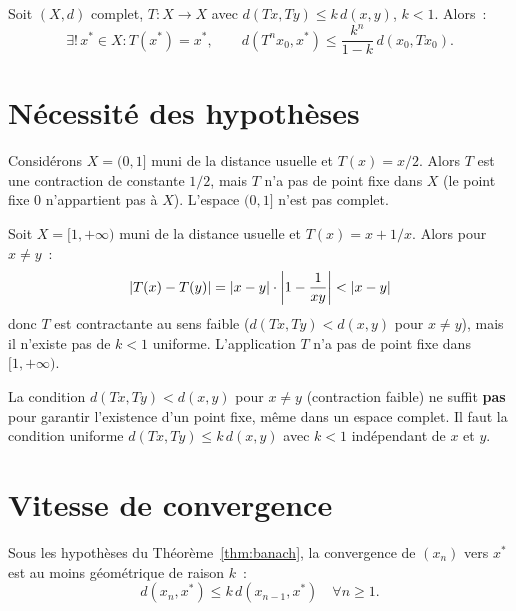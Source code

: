 \begin{formules}[title=\textbf{Principe de Contraction de Banach}]
Soit $(X, d)$ complet, $T : X \to X$ avec $d(Tx, Ty) \leq k \, d(x,y)$, $k < 1$. Alors~:
\[
    \exists!\, x^* \in X : T(x^*) = x^*, \qquad
    d(T^n x_0, x^*) \leq \frac{k^n}{1-k}\, d(x_0, Tx_0).
\]
\end{formules}

\section{N\'ecessit\'e des hypoth\`eses}

\begin{exemple}
Consid\'erons $X = (0, 1]$ muni de la distance usuelle et $T(x) = x/2$.
Alors $T$ est une contraction de constante $1/2$, mais $T$ n'a pas de point
fixe dans $X$ (le point fixe $0$ n'appartient pas \`a $X$). L'espace $(0,1]$
n'est pas complet.
\end{exemple}

\begin{exemple}[N\'ecessit\'e de $k < 1$]
Soit $X = [1, +\infty)$ muni de la distance usuelle et $T(x) = x + 1/x$.
Alors pour $x \neq y$~:
\[
    \left| T(x) - T(y) \right| = \left| x - y \right| \cdot \left| 1 - \frac{1}{xy} \right| < \left| x - y \right|
\]
donc $T$ est contractante au sens faible ($d(Tx, Ty) < d(x,y)$ pour $x \neq y$),
mais il n'existe pas de $k < 1$ uniforme. L'application $T$ n'a pas de point
fixe dans $[1, +\infty)$.
\end{exemple}

\begin{attention}[title=\textbf{Contraction stricte vs.\ contraction faible}]
La condition $d(Tx, Ty) < d(x,y)$ pour $x \neq y$ (contraction faible) ne
suffit \textbf{pas} pour garantir l'existence d'un point fixe, m\^eme dans un
espace complet. Il faut la condition uniforme $d(Tx, Ty) \leq k \, d(x,y)$
avec $k < 1$ ind\'ependant de $x$ et $y$.
\end{attention}

\section{Vitesse de convergence}

\begin{proposition}
Sous les hypoth\`eses du Th\'eor\`eme~\ref{thm:banach}, la convergence de $(x_n)$
vers $x^*$ est au moins g\'eom\'etrique de raison $k$~:
\[
    d(x_n, x^*) \leq k \, d(x_{n-1}, x^*) \quad \forall n \geq 1.
\]
\end{proposition}

